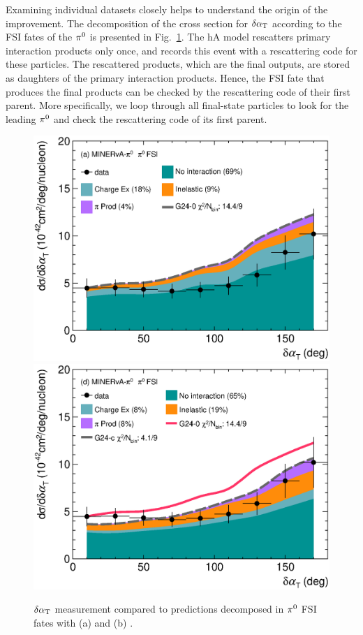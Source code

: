 Examining individual datasets closely helps to understand the origin of the improvement. The decomposition of the cross section for $\delta\alpha_\textrm{T}$ according to the FSI fates of the $\pi^0$ is presented in Fig.~\ref{fig:CEX-minpiz-dat-pi0}. The hA model rescatters primary interaction products only once, and records this event with a rescattering code for these particles. The rescattered products, which are the final outputs, are stored as daughters of the primary interaction products. Hence, the FSI fate that produces the final products can be checked by the rescattering code of their first parent. More specifically, we loop through all final-state particles to look for the leading $\pi^0$ and check the rescattering code of its first parent. 

\begin{figure}[!htb] 	
    \centering 		
    \includegraphics[width=\dbfigwid\textwidth]{figures/0000-min_pi0_dalphat_pi0_decomp_cex.eps}
    \includegraphics[width=\dbfigwid\textwidth]{figures/0026-min_pi0_dalphat_pi0_decomp.eps}	
    \caption{\label{fig:CEX-minpiz-dat-pi0} \minpiz $\delta\alpha_\textrm{T}$ measurement compared to \genie predictions decomposed in $\pi^0$ FSI fates with (a) \gZero and (b) \gC.} 
\end{figure}

